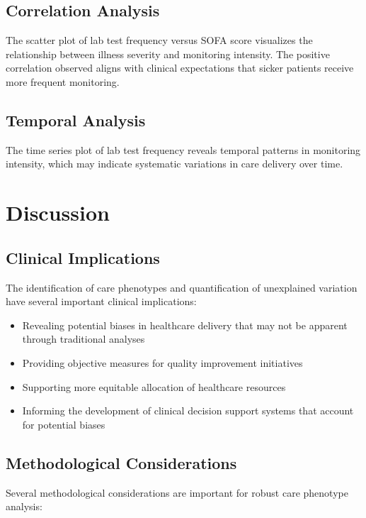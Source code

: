 \documentclass[12pt]{article}
\begin{document}
\subsection{Correlation Analysis}

The scatter plot of lab test frequency versus SOFA score visualizes the relationship between illness severity and monitoring intensity. The positive correlation observed aligns with clinical expectations that sicker patients receive more frequent monitoring.

\subsection{Temporal Analysis}

The time series plot of lab test frequency reveals temporal patterns in monitoring intensity, which may indicate systematic variations in care delivery over time.

\section{Discussion}

\subsection{Clinical Implications}

The identification of care phenotypes and quantification of unexplained variation have several important clinical implications:

\begin{itemize}
    \item Revealing potential biases in healthcare delivery that may not be apparent through traditional analyses
    \item Providing objective measures for quality improvement initiatives
    \item Supporting more equitable allocation of healthcare resources
    \item Informing the development of clinical decision support systems that account for potential biases
\end{itemize}

\subsection{Methodological Considerations}

Several methodological considerations are important for robust care phenotype analysis:
\end{document}
